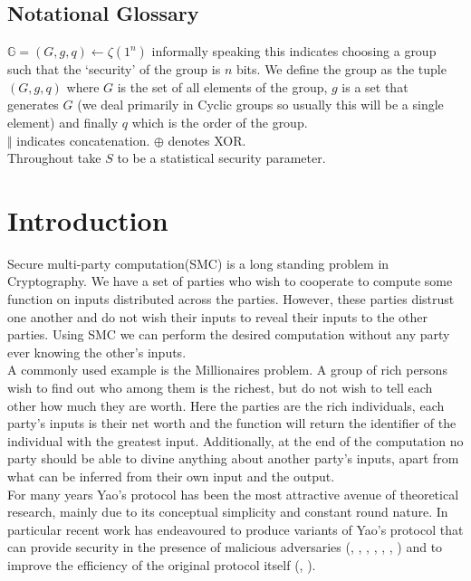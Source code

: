 \documentclass[ %
                    author={Nicholas Tutte},
                supervisor={Prof. Nigel Smart},
                    degree={MEng},
                     title={Secure Two Party Computation},
                  subtitle={A practical comparison of recent protocols},
                      type={Research - GG1K},
                      year={2015} ]{dissertation}
\begin{document}
		\section*{Notational Glossary}
			$\mathbb{G} = (G, g, q) \leftarrow \zeta(1^n)$ informally speaking this indicates choosing a group such that the `security' of the group is $n$ bits. We define the group as the tuple $(G, g, q)$ where $G$ is the set of all elements of the group, $g$ is a set that generates $G$ (we deal primarily in Cyclic groups so usually this will be a single element) and finally $q$ which is the order of the group.\\

			$\Vert$ indicates concatenation. $\oplus$ denotes XOR.\\

			Throughout take $S$ to be a statistical security parameter.\\

	\tableofcontents

	
	\chapter{Introduction}
		Secure multi-party computation(SMC) is a long standing problem in Cryptography. We have a set of parties who wish to cooperate to compute some function on inputs distributed across the parties. However, these parties distrust one another and do not wish their inputs to reveal their inputs to the other parties. Using SMC we can perform the desired computation without any party ever knowing the other's inputs.\\

		A commonly used example is the Millionaires problem. A group of rich persons wish to find out who among them is the richest, but do not wish to tell each other how much they are worth. Here the parties are the rich individuals, each party's inputs is their net worth and the function will return the identifier of the individual with the greatest input. Additionally, at the end of the computation no party should be able to divine anything about another party's inputs, apart from what can be inferred from their own input and the output.\\

		For many years Yao's protocol \cite{YaoOriginal} has been the most attractive avenue of theoretical research, mainly due to its conceptual simplicity and constant round nature. In particular recent work has endeavoured to produce variants of Yao's protocol that can provide security in the presence of malicious adversaries (\cite{LindellAndPinkas2007}, \cite{LindellAndPinkas2011}, \cite{Lindell_CnC_2013}, \cite{Katz_Symm_CnC_2013}, \cite{OnCommittedInputs}, \cite{LEGO_Paper}, \cite{MiniLEGO}) and to improve the efficiency of the original protocol itself (\cite{SMC_Is_Practical}, \cite{FreeXOR}).\\
\end{document}
